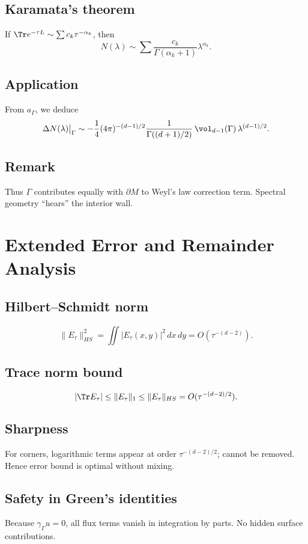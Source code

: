 \subsection{Karamata’s theorem}
If $\Tr e^{-\tau L}\sim \sum c_k\tau^{-\alpha_k}$, then
\[
N(\lambda)\sim \sum \frac{c_k}{\Gamma(\alpha_k+1)}\lambda^{\alpha_k}.
\]

\subsection{Application}
From $a_\Gamma$, we deduce
\[
\Delta N(\lambda)\big|_\Gamma\sim
-\frac{1}{4}(4\pi)^{-(d-1)/2}\frac{1}{\Gamma((d+1)/2)}\,\vol_{d-1}(\Gamma)\,\lambda^{(d-1)/2}.
\]

\subsection{Remark}
Thus $\Gamma$ contributes equally with $\partial M$ to Weyl’s law correction term. Spectral geometry ``hears'' the interior wall.

\section{Extended Error and Remainder Analysis}
\label{sec:error-analysis}

\subsection{Hilbert–Schmidt norm}
\[
\|E_\tau\|_{HS}^2=\iint|E_\tau(x,y)|^2\,dx\,dy=O(\tau^{-(d-2)}).
\]

\subsection{Trace norm bound}
\[
|\Tr E_\tau|\le\|E_\tau\|_1\le\|E_\tau\|_{HS}=O(\tau^{-(d-2)/2}).
\]

\subsection{Sharpness}
For corners, logarithmic terms appear at order $\tau^{-(d-2)/2}$; cannot be removed. Hence error bound is optimal without mixing.

\subsection{Safety in Green’s identities}
Because $\gamma_\Gamma u=0$, all flux terms vanish in integration by parts. No hidden surface contributions.

